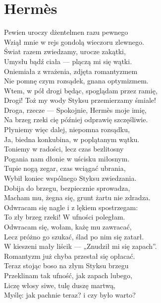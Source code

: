 \documentclass[12pt, a4paper]{memoir}
\renewenvironment{verse}{%
  \par\vspace{\baselineskip}\raggedright
}{
  \par\vspace{\baselineskip}
}
\begin{document}
\section{Hermès}
\begin{verse}
Pewien uroczy dżentelmen razu pewnego\\
Wziął mnie w rejs gondolą wieczoru zlewnego.\\
Świat razem zwiedzamy, urocze zakątki,\\
Umysłu bądź ciała --- plączą mi się wątki.\\[\baselineskip]

Oniemiała z wrażenia, zdjęta romantyzmem\\
Nie pomnę czym rozsądek, gnana optymizmem.\\
Wtem, w pół drogi będąc, spoglądam przez ramię,\\
Drogi! Toż my wody Styksu przemierzamy śmiale!\\[\baselineskip]

Droga, rzecze --- Spokojnie, Hermès moje imię,\\
Na brzeg rzeki cię później odprawię szczęśliwie.\\
Płyniemy więc dalej, niepomna rozsądku,\\
Ja, biedna konkubina, w poplątanym wątku.\\[\baselineskip]

Toniemy w radości, lecz czas bezlitosny\\
Pogania nam dłonie w uścisku miłosnym.\\
Tupie nogą zegar, czas wciągać ubrania,\\
Wybił koniec wspólnego Styksu zwiedzania.\\[\baselineskip]

Dobija do brzegu, bezpiecznie sprowadza,\\
Macham mu, żegna się, grunt żartu nie zdradza.\\
Odwracam się nagle i z lękiem spostrzegam:\\
To zły brzeg rzeki! W ufności poległam.\\[\baselineskip]

Odwracam się, wołam, każę mu zawracać,\\
Lecz próżno go szukać, ślad po nim się zatarł.\\
W kieszeni mały liścik --- „Znudził mi się zapach”.\\
Romantyzm już chyba przestał się opłacać.\\[\baselineskip]

Teraz stojąc boso na złym Styksu brzegu\\
Przeklinam tak ufność, jak zapach lubego,\\
Liczę włosy siwe, tulę duszę martwą,\\
Myślę: jak pachnie teraz? i czy było warto?
\end{verse}
\end{document}

